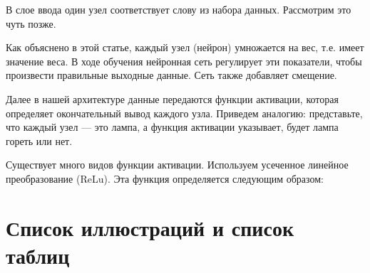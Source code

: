 \documentclass[a4paper, 12pt]{article}
\begin{document}
В слое ввода один узел соответствует слову из набора данных. Рассмотрим это чуть позже.

Как объяснено в этой статье, каждый узел (нейрон) умножается на вес, т.е. имеет значение веса. В ходе обучения нейронная сеть регулирует эти показатели, чтобы произвести правильные выходные данные. Сеть также добавляет смещение.

Далее в нашей архитектуре данные передаются функции активации, которая определяет окончательный вывод каждого узла. Приведем аналогию: представьте, что каждый узел — это лампа, а функция активации указывает, будет лампа гореть или нет.

Существует много видов функции активации. Используем усеченное линейное преобразование (ReLu). Эта функция определяется следующим образом:


\section{Список иллюстраций и список таблиц}

\listoffigures

\listoftables
\end{document}
